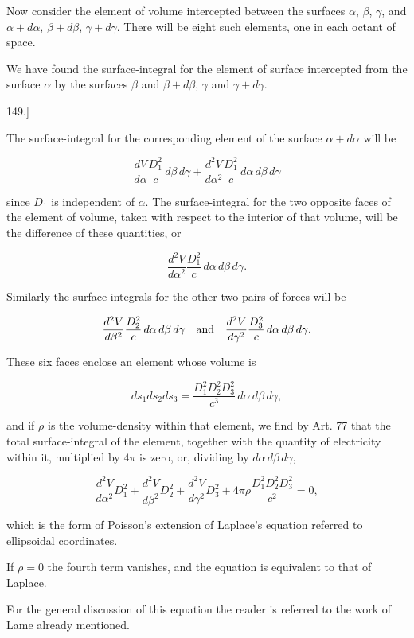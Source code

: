 \documentclass[11pt,a4paper]{article}
\begin{document}
Now consider the element of volume intercepted between the surfaces $\alpha$, $\beta$, $\gamma$, and $\alpha+d\alpha$, $\beta+d\beta$, $\gamma+d\gamma$. There will be eight such elements, one in each octant of space.

We have found the surface-integral for the element of surface intercepted from the surface $\alpha$ by the surfaces $\beta$ and $\beta+d\beta$, $\gamma$ and $\gamma+d\gamma$.

149.]

The surface-integral for the corresponding element of the surface $\alpha+d\alpha$ will be

\[
\frac{dV}{d\alpha}\frac{D_1^2}{c}\,d\beta\,d\gamma
+\frac{d^2V}{d\alpha^2}\frac{D_1^2}{c}\,d\alpha\,d\beta\,d\gamma
\]

since $D_1$ is independent of $\alpha$. The surface-integral for the two opposite faces of the element of volume, taken with respect to the interior of that volume, will be the difference of these quantities, or

\[
\frac{d^2V}{d\alpha^2}\frac{D_1^2}{c}\,d\alpha\,d\beta\,d\gamma.
\]

Similarly the surface-integrals for the other two pairs of forces will be

\[
\frac{d^2V}{d\beta^2}\frac{D_2^2}{c}\,d\alpha\,d\beta\,d\gamma
\quad\hbox{and}\quad
\frac{d^2V}{d\gamma^2}\frac{D_3^2}{c}\,d\alpha\,d\beta\,d\gamma.
\]

These six faces enclose an element whose volume is

\[
ds_1ds_2ds_3=\frac{D_1^2D_2^2D_3^2}{c^3}\,d\alpha\,d\beta\,d\gamma,
\]

and if $\rho$ is the volume-density within that element, we find by Art. 77 that the total surface-integral of the element, together with the quantity of electricity within it, multiplied by $4\pi$ is zero, or, dividing by $d\alpha\,d\beta\,d\gamma$,

\begin{equation}\tag{11}
\frac{d^2V}{d\alpha^2}D_1^2
+\frac{d^2V}{d\beta^2}D_2^2
+\frac{d^2V}{d\gamma^2}D_3^2
+4\pi\rho\frac{D_1^2D_2^2D_3^2}{c^2}=0,
\end{equation}

which is the form of Poisson's extension of Laplace's equation referred to ellipsoidal coordinates.

If  $\rho = 0$  the fourth term vanishes, and the equation is equivalent to that of Laplace.

For the general discussion of this equation the reader is referred to the work of Lame already mentioned.
\end{document}
